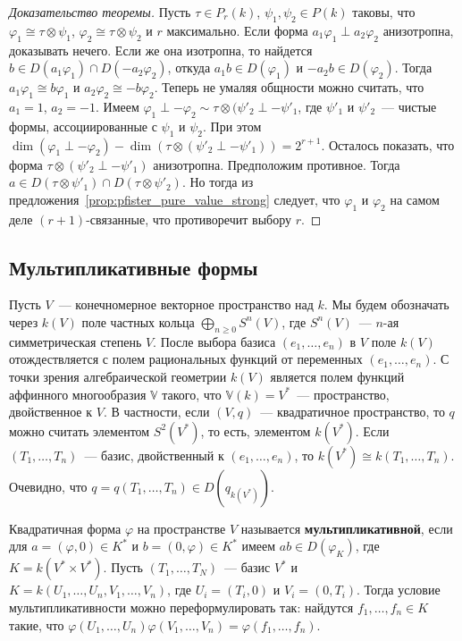 \documentclass[a4paper,oneside,12pt]{article}
\theoremstyle{plain} { \swapnumbers
\newtheorem{theorem}{Теорема}[subsection]
\newtheorem{corollary}[theorem]{Следствие}
\newtheorem{lemma}[theorem]{Лемма}
\newtheorem{proposition}[theorem]{Утверждение}
\newtheorem{claim}[theorem]{Факт}
}
\theoremstyle{definition} { \swapnumbers
\newtheorem{definition}[theorem]{Определение}
\newtheorem{notation}[theorem]{Обозначение}
\newtheorem{remark}[theorem]{Замечание}
\newtheorem{remarks}[theorem]{Замечания}
\newtheorem{example}[theorem]{Пример}
\newtheorem{examples}[theorem]{Примеры}
\newtheorem{sssection}[theorem]{}
}
\def\ph{\varphi}
\begin{document}
\begin{proof}[Доказательство теоремы]
Пусть $\tau\in P_r(k)$, $\psi_1,\psi_2\in P(k)$ таковы, что $\ph_1\cong\tau\otimes\psi_1$, $\ph_2\cong\tau\otimes\psi_2$
и $r$ максимально. Если форма $a_1\ph_1\perp a_2\ph_2$ анизотропна, доказывать нечего. Если же она изотропна, то
найдется $b\in D(a_1\ph_1)\cap D(-a_2\ph_2)$, откуда $a_1b\in D(\ph_1)$ и $-a_2b\in D(\ph_2)$. Тогда
$a_1\ph_1\cong b\ph_1$ и $a_2\ph_2\cong-b\ph_2$. Теперь не умаляя общности можно считать, что $a_1=1$, $a_2=-1$.
Имеем $\ph_1\perp -\ph_2\sim\tau\otimes(\psi'_2\perp -\psi'_1$, где $\psi'_1$ и $\psi'_2$~--- чистые формы,
ассоциированные с $\psi_1$ и $\psi_2$. При этом $\dim(\ph_1\perp -\ph_2)-\dim(\tau\otimes(\psi'_2\perp -\psi'_1))=2^{r+1}$.
Осталось показать, что форма $\tau\otimes(\psi'_2\perp -\psi'_1)$ анизотропна. Предположим противное.
Тогда $a\in D(\tau\otimes\psi'_1)\cap D(\tau\otimes\psi'_2)$. Но тогда из предложения~\ref{prop:pfister_pure_value_strong}
следует, что $\ph_1$ и $\ph_2$ на самом деле $(r+1)$-связанные, что противоречит выбору $r$.
\end{proof}

\subsection{Мультипликативные формы}

\begin{definition}
Пусть $V$~--- конечномерное векторное пространство над $k$. Мы будем обозначать через $k(V)$
поле частных кольца $\bigoplus_{n\geq 0}S^n(V)$, где $S^n(V)$~--- $n$-ая симметрическая степень $V$.
После выбора базиса $(e_1,\dots,e_n)$ в $V$ поле $k(V)$ отождествляется с полем рациональных
функций от переменных $(e_1,\dots,e_n)$. С точки зрения алгебраической геометрии $k(V)$ является
полем функций аффинного многообразия $\mathbb V$ такого, что $\mathbb V(k)=V^*$~--- пространство,
двойственное к $V$. В частности, если $(V,q)$~--- квадратичное пространство, то $q$ можно
считать элементом $S^2(V^*)$, то есть, элементом $k(V^*)$. Если $(T_1,\dots,T_n)$~--- базис,
двойственный к $(e_1,\dots,e_n)$, то $k(V^*)\cong k(T_1,\dots,T_n)$. Очевидно,
что $q=q(T_1,\dots,T_n)\in D(q_{k(V^*)})$.
\end{definition}

\begin{definition}
Квадратичная форма $\ph$ на пространстве $V$ называется {\bf мультипликативной}, если для
$a=(\ph,0)\in K^*$ и $b=(0,\ph)\in K^*$ имеем $ab\in D(\ph_K)$, где $K=k(V^*\times V^*)$.
Пусть $(T_1,\dots,T_N)$~--- базис $V^*$ и $K=k(U_1,\dots,U_n,V_1,\dots,V_n)$,
где $U_i=(T_i,0)$ и $V_i=(0,T_i)$. Тогда условие мультипликативности можно переформулировать
так: найдутся $f_1,\dots,f_n\in K$ такие, что $\ph(U_1,\dots,U_n)\ph(V_1,\dots,V_n)=\ph(f_1,\dots,f_n)$.
\end{definition}
\end{document}
